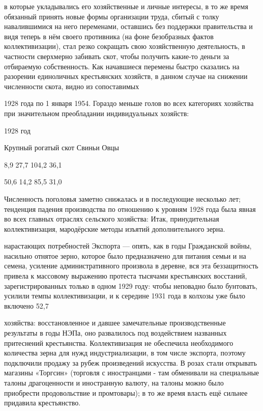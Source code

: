 в которые укладывались его хозяйственные и личные интересы, в то же время обязанный принять новые формы организации труда, сбитый с толку навалившимися на него переменами, оставшись без поддержки правительства и видя теперь в нём своего противника (на фоне безобразных фактов коллективизации), стал резко сокращать свою хозяйственную деятельность, в частности сверхмерно забивать скот, чтобы получить какие-то деньги за отбираемую собственность. Как начавшиеся перемены быстро сказались на разорении единоличных крестьянских хозяйств, в данном случае на снижении численности скота, видно из сопоставимых

1928 года по 1 января 1954. Гораздо меньше голов во всех категориях хозяйства при значительном преобладании индивидуальных хозяйств:

1928 год

Крупный рогатый скот Свиньи Овцы

8,9 27,7 104,2 36,1

50,6 14,2 85,5 31,0

Численность поголовья заметно снижалась и в последующие несколько лет; тенденция падения производства по отношению к уровням 1928 года была явная во всех главных отраслях сельского хозяйства: Итак, принудительная коллективизация, мародёрские методы изъятий дополнительного зерна.

нарастающих потребностей Экспорта — опять, как в годы Гражданской войны, насильно отнятое зерно, которое было предназначено для питания семьи и на семена, усиление административного произвола в деревне, вся эта беззащитность привела к массовому выражению протеста тысячами крестьянских восстаний, зарегистрированных только в одном 1929 году: чтобы неповадно было бунтовать, усилили темпы коллективизации, и к середине 1931 года в колхозы уже было включено 52,7%

хозяйства: восстановленное и давшее замечательные производственные результаты в годы НЭПа, оно развалилось под воздействием названных притеснений крестьянства. Коллективизация не обеспечила необходимого количества зерна для нужд индустриализации, в том числе экспорта, поэтому подключили продажу за рубеж произведений искусства. В розах стали открывать магазины «Торгсин» (торговля с иностранцами - там обменивали на специальные талоны драгоценности и иностранную валюту, на талоны можно было приобрести продовольствие и промтовары); в то же время власть ещё сильнее придавила крестьянство.

